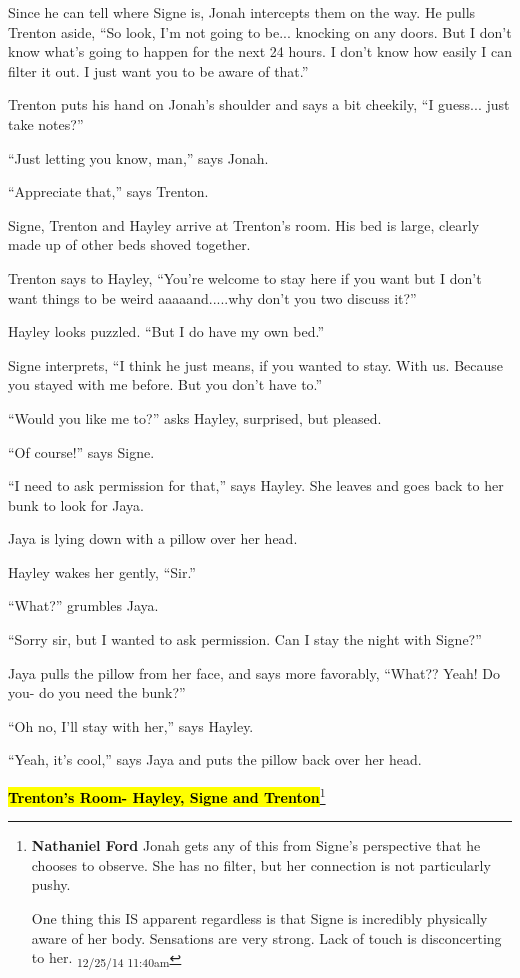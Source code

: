 Since he can tell where Signe is, Jonah intercepts them on the way.  He pulls Trenton aside, ``So look, I'm not going to be... knocking on any doors.  But I don't know what's going to happen for the next 24 hours.  I don't know how easily I can filter it out.  I just want you to be aware of that.''

Trenton puts his hand on Jonah's shoulder and says a bit cheekily, ``I guess... just take notes?''

``Just letting you know, man,'' says Jonah.

``Appreciate that,'' says Trenton.



Signe, Trenton and Hayley arrive at Trenton's room.  His bed is large, clearly made up of other beds shoved together.

Trenton says to Hayley, ``You're welcome to stay here if you want but I don't want things to be weird aaaaand.....why don't you two discuss it?''

Hayley looks puzzled.  ``But I do have my own bed.''

Signe interprets, ``I think he just means, if you wanted to stay.  With us.  Because you stayed with me before.  But you don't have to.''

``Would you like me to?'' asks Hayley, surprised, but pleased.

``Of course!'' says Signe.

``I need to ask permission for that,'' says Hayley.  She leaves and goes back to her bunk to look for Jaya.



Jaya is lying down with a pillow over her head.  

Hayley wakes her gently, ``Sir.''

``What?'' grumbles Jaya.

``Sorry sir, but I wanted to ask permission.  Can I stay the night with Signe?''

Jaya pulls the pillow from her face, and says more favorably, ``What??  Yeah!  Do you- do you need the bunk?''

``Oh no, I'll stay with her,'' says Hayley.

``Yeah, it's cool,'' says Jaya and puts the pillow back over her head.





\textbf{\hl{Trenton's Room- Hayley, Signe and Trenton}}\footnote{\textbf{Nathaniel Ford }Jonah gets any of this from Signe's perspective that he chooses to observe. She has no filter, but her connection is not particularly pushy.

One thing this IS apparent regardless is that Signe is incredibly physically aware of her body. Sensations are very strong. Lack of touch is disconcerting to her. \textsubscript{12/25/14 11:40am}}



